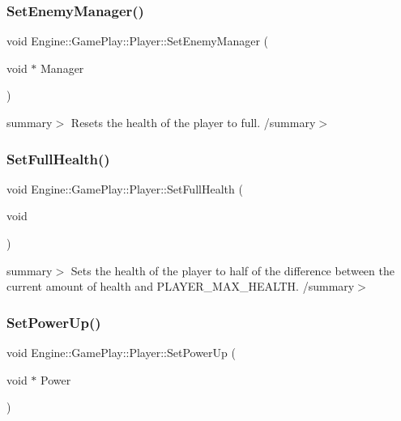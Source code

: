 \subsubsection{\texorpdfstring{Set\+Enemy\+Manager()}{SetEnemyManager()}}
{\footnotesize\ttfamily void Engine\+::\+Game\+Play\+::\+Player\+::\+Set\+Enemy\+Manager (\begin{DoxyParamCaption}\item[{void $\ast$}]{Manager }\end{DoxyParamCaption})}

summary$>$ Resets the health of the player to full. /summary$>$ \mbox{\label{class_engine_1_1_game_play_1_1_player_a426ebc69b0607902e73563655ad66693}} 
\subsubsection{\texorpdfstring{Set\+Full\+Health()}{SetFullHealth()}}
{\footnotesize\ttfamily void Engine\+::\+Game\+Play\+::\+Player\+::\+Set\+Full\+Health (\begin{DoxyParamCaption}\item[{void}]{ }\end{DoxyParamCaption})}

summary$>$ Sets the health of the player to half of the difference between the current amount of health and P\+L\+A\+Y\+E\+R\+\_\+\+M\+A\+X\+\_\+\+H\+E\+A\+L\+TH. /summary$>$ \mbox{\label{class_engine_1_1_game_play_1_1_player_aa592871c49210d80e1cda615e0dee15d}} 
\subsubsection{\texorpdfstring{Set\+Power\+Up()}{SetPowerUp()}}
{\footnotesize\ttfamily void Engine\+::\+Game\+Play\+::\+Player\+::\+Set\+Power\+Up (\begin{DoxyParamCaption}\item[{void $\ast$}]{Power }\end{DoxyParamCaption})}

